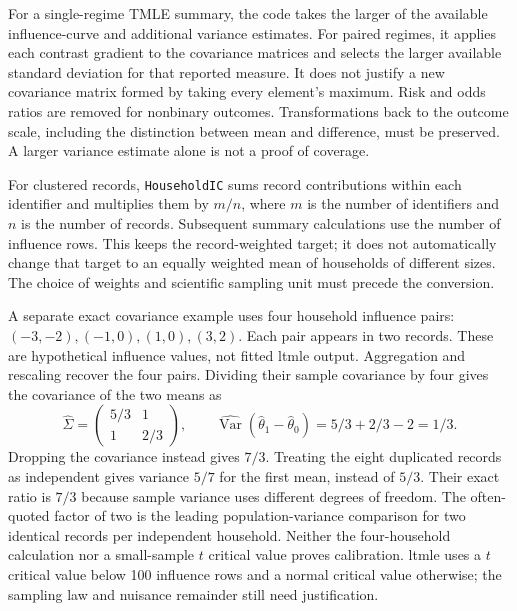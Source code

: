 For a single-regime TMLE summary, the code takes the larger of the available
influence-curve and additional variance estimates. For paired regimes, it
applies each contrast gradient to the covariance matrices and selects the
larger available standard deviation for that reported measure. It does not
justify a new covariance matrix formed by taking every element's maximum.
Risk and odds ratios are removed for nonbinary outcomes. Transformations back
to the outcome scale, including the distinction between mean and difference,
must be preserved. A larger variance estimate alone is not a proof of
coverage.~\citep{exec23_ltmle_source}

For clustered records, \texttt{HouseholdIC} sums record contributions within
each identifier and multiplies them by $m/n$, where $m$ is the number of
identifiers and $n$ is the number of records. Subsequent summary calculations
use the number of influence rows. This keeps the record-weighted target;
it does not automatically change that target to an equally weighted mean
of households of different sizes. The choice of weights and scientific
sampling unit must precede the conversion.

A separate exact covariance example uses four household influence pairs:
$(-3,-2),(-1,0),(1,0),(3,2)$. Each pair appears in two records. These are
hypothetical influence values, not fitted ltmle output. Aggregation and
rescaling recover the four pairs. Dividing their sample covariance by four
gives the covariance of the two means as
\begin{equation}
 \widehat\Sigma=\begin{pmatrix}5/3&1\\1&2/3\end{pmatrix},\qquad
 \widehat{\operatorname{Var}}(\widehat\theta_1-\widehat\theta_0)
 =5/3+2/3-2=1/3.
 \label{exec23:ltmle-cluster}
\end{equation}
Dropping the covariance instead gives $7/3$. Treating the eight duplicated
records as independent gives variance $5/7$ for the first mean, instead of
$5/3$. Their exact ratio is $7/3$ because sample variance uses different
degrees of freedom. The often-quoted factor of two is the leading
population-variance comparison for two identical records per independent
household. Neither the four-household calculation nor a small-sample
$t$ critical value proves calibration. ltmle uses a $t$ critical value below
100 influence rows and a normal critical value otherwise; the sampling law
and nuisance remainder still need justification.
\citep{exec23_ltmle_source,exec23_ltmle_exact}

